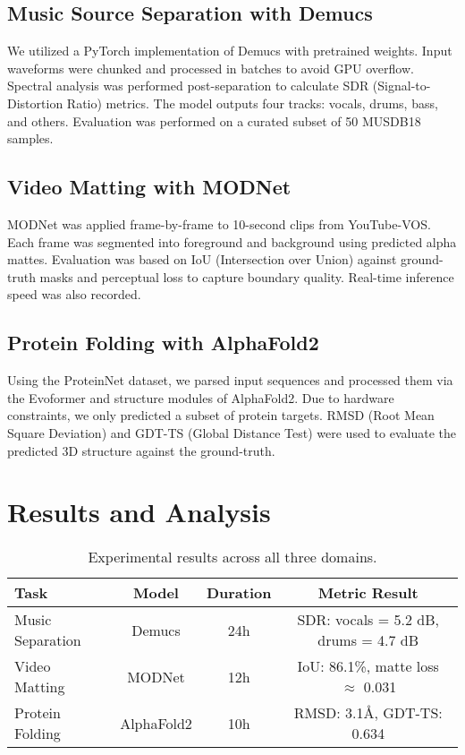 \documentclass{article}
\begin{document}
\subsection{Music Source Separation with Demucs}
We utilized a PyTorch implementation of Demucs with pretrained weights. Input waveforms were chunked and processed in batches to avoid GPU overflow. Spectral analysis was performed post-separation to calculate SDR (Signal-to-Distortion Ratio) metrics. The model outputs four tracks: vocals, drums, bass, and others. Evaluation was performed on a curated subset of 50 MUSDB18 samples.

\subsection{Video Matting with MODNet}
MODNet was applied frame-by-frame to 10-second clips from YouTube-VOS. Each frame was segmented into foreground and background using predicted alpha mattes. Evaluation was based on IoU (Intersection over Union) against ground-truth masks and perceptual loss to capture boundary quality. Real-time inference speed was also recorded.

\subsection{Protein Folding with AlphaFold2}
Using the ProteinNet dataset, we parsed input sequences and processed them via the Evoformer and structure modules of AlphaFold2. Due to hardware constraints, we only predicted a subset of protein targets. RMSD (Root Mean Square Deviation) and GDT-TS (Global Distance Test) were used to evaluate the predicted 3D structure against the ground-truth.

\section{Results and Analysis}

\begin{table}[h]
\centering
\begin{tabular}{lccc}
\toprule
\textbf{Task} & \textbf{Model} & \textbf{Duration} & \textbf{Metric Result} \\
\midrule
Music Separation & Demucs & 24h & SDR: vocals = 5.2 dB, drums = 4.7 dB \\
Video Matting & MODNet & 12h & IoU: 86.1\%, matte loss $\approx$ 0.031 \\
Protein Folding & AlphaFold2 & 10h & RMSD: 3.1\AA, GDT-TS: 0.634 \\
\bottomrule
\end{tabular}
\caption{Experimental results across all three domains.}
\end{table}
\end{document}
